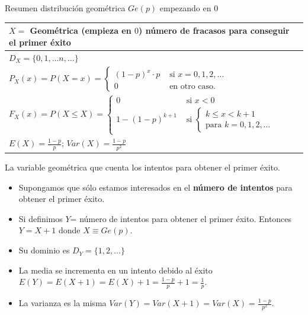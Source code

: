 \documentclass[
  ignorenonframetext,
  aspectratio=169]{beamer}
\providecommand{\tightlist}{%
  \setlength{\itemsep}{0pt}\setlength{\parskip}{0pt}}\usepackage{longtable,booktabs,array}
\begin{document}
\begin{frame}{Resumen distribución geométrica \(Ge(p)\) empezando en 0}
\protect\hypertarget{resumen-distribuciuxf3n-geomuxe9trica-gep-empezando-en-0}{}
\renewcommand{\arraystretch}{1.75}
\begin{table}
\centering
\begin{tabular}{|l|}
\hline\rowcolor{LightBlue}
$X=$ Geométrica (empieza en $0$) número de fracasos  para conseguir el primer éxito
\\\hline
$D_X=\{0,1,\ldots n,\ldots\}$ \\\hline
$P_X(x)=P(X=x)=\left\{\begin{array}{ll}(1-p)^{x}\cdot p & \mbox{ si } x=0,1,2,\ldots \\0  & \mbox{ en otro caso.}\end{array}\right.$\\\hline
$F_X(x)=P(X\leq X)=\left\{\begin{array}{ll} 0 & \mbox{ si } x<0\\
  1- (1-p)^{k+1} & \mbox{ si } \left\{ \begin{array}{l}k\leq x< k+1\\\mbox{para } k=0,1,2,\ldots\end{array}
    \right.\end{array}\right.$ \\\hline
$E(X)=\frac{1-p}{p}$; $Var(X)=\frac{1-p}{p^2}$\\\hline
\end{tabular}
\end{table}
\end{frame}

\begin{frame}{La variable geométrica que cuenta los intentos para
obtener el primer éxito.}
\protect\hypertarget{la-variable-geomuxe9trica-que-cuenta-los-intentos-para-obtener-el-primer-uxe9xito.}{}
\begin{itemize}
\tightlist
\item
  Supongamos que sólo estamos interesados en el \textbf{número de
  intentos} para obtener el primer éxito.
\item
  Si definimos \(Y\)= número de intentos para obtener el primer éxito.
  Entonces \(Y=X+1\) donde \(X\equiv Ge(p)\).
\item
  Su dominio es \(D_Y=\{1,2,\ldots\}\)
\item
  La media se incrementa en un intento debido al éxito
  \(E(Y)=E(X+1)=E(X)+1=\frac{1-p}{p}+1=\frac1{p}\).
\item
  La varianza es la misma \(Var(Y)=Var(X+1)=Var(X)=\frac{1-p}{p^2}\).
\end{itemize}
\end{frame}
\end{document}
